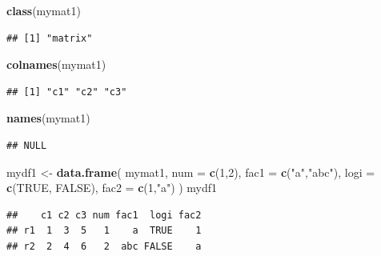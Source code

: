 \documentclass[]{book}
\newenvironment{Shaded}{\begin{snugshade}}{\end{snugshade}}
\newcommand{\KeywordTok}[1]{\textcolor[rgb]{0.13,0.29,0.53}{\textbf{{#1}}}}
\newcommand{\DataTypeTok}[1]{\textcolor[rgb]{0.13,0.29,0.53}{{#1}}}
\newcommand{\DecValTok}[1]{\textcolor[rgb]{0.00,0.00,0.81}{{#1}}}
\newcommand{\StringTok}[1]{\textcolor[rgb]{0.31,0.60,0.02}{{#1}}}
\newcommand{\OtherTok}[1]{\textcolor[rgb]{0.56,0.35,0.01}{{#1}}}
\newcommand{\NormalTok}[1]{{#1}}
\theoremstyle{definition}
\theoremstyle{definition}
\theoremstyle{remark}
\begin{document}
\begin{Shaded}
\begin{Highlighting}[]
\KeywordTok{class}\NormalTok{(mymat1)}
\end{Highlighting}
\end{Shaded}

\begin{verbatim}
## [1] "matrix"
\end{verbatim}

\begin{Shaded}
\begin{Highlighting}[]
\KeywordTok{colnames}\NormalTok{(mymat1)}
\end{Highlighting}
\end{Shaded}

\begin{verbatim}
## [1] "c1" "c2" "c3"
\end{verbatim}

\begin{Shaded}
\begin{Highlighting}[]
\KeywordTok{names}\NormalTok{(mymat1)}
\end{Highlighting}
\end{Shaded}

\begin{verbatim}
## NULL
\end{verbatim}

\begin{Shaded}
\begin{Highlighting}[]
\NormalTok{mydf1 <-}\StringTok{ }\KeywordTok{data.frame}\NormalTok{(}
                \NormalTok{mymat1, }
                \DataTypeTok{num  =} \KeywordTok{c}\NormalTok{(}\DecValTok{1}\NormalTok{,}\DecValTok{2}\NormalTok{),         }
                \DataTypeTok{fac1 =} \KeywordTok{c}\NormalTok{(}\StringTok{"a"}\NormalTok{,}\StringTok{"abc"}\NormalTok{),    }
                \DataTypeTok{logi =} \KeywordTok{c}\NormalTok{(}\OtherTok{TRUE}\NormalTok{, }\OtherTok{FALSE}\NormalTok{), }
                \DataTypeTok{fac2  =} \KeywordTok{c}\NormalTok{(}\DecValTok{1}\NormalTok{,}\StringTok{"a"}\NormalTok{)   }
              \NormalTok{)  }
\NormalTok{mydf1}
\end{Highlighting}
\end{Shaded}

\begin{verbatim}
##    c1 c2 c3 num fac1  logi fac2
## r1  1  3  5   1    a  TRUE    1
## r2  2  4  6   2  abc FALSE    a
\end{verbatim}
\end{document}
